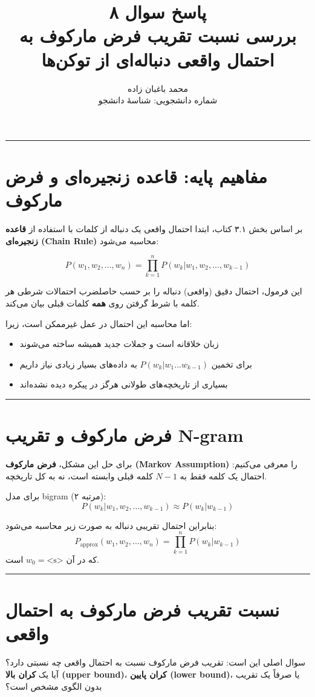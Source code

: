 \documentclass[11pt,a4paper]{article}
\title{\textbf{پاسخ سوال ۸} \\[0.4cm] \footnotesize بررسی نسبت تقریب فرض مارکوف به احتمال واقعی دنباله‌ای از توکن‌ها}
\author{محمد باغبان زاده \\ شماره دانشجویی: شناسهٔ دانشجو}
\date{}
\newcommand{\en}[1]{\textenglish{#1}}
\newcommand{\separator}{\vspace{1em}\noindent\rule{\linewidth}{0.4pt}\vspace{1em}}
\newcommand{\thickseparator}{\vspace{1em}\noindent\rule{\linewidth}{1pt}\vspace{1em}}
\begin{document}
\maketitle
\thickseparator

\section{مفاهیم پایه: قاعده زنجیره‌ای و فرض مارکوف}
بر اساس بخش \en{۳.۱} کتاب، ابتدا احتمال واقعی یک دنباله از کلمات با استفاده از \textbf{قاعده زنجیره‌ای (\en{Chain Rule})} محاسبه می‌شود:

\[
P(w_1, w_2, ..., w_n) = \prod_{k=1}^{n} P(w_k | w_1, w_2, ..., w_{k-1})
\]

این فرمول، احتمال دقیق (واقعی) دنباله را بر حسب حاصلضرب احتمالات شرطی هر کلمه با شرط گرفتن روی \textbf{همه} کلمات قبلی بیان می‌کند.

اما محاسبه این احتمال در عمل غیرممکن است، زیرا:
\begin{itemize}
\item زبان خلاقانه است و جملات جدید همیشه ساخته می‌شوند
\item برای تخمین $P(w_k | w_1...w_{k-1})$ به داده‌های بسیار زیادی نیاز داریم
\item بسیاری از تاریخچه‌های طولانی هرگز در پیکره دیده نشده‌اند
\end{itemize}

\separator
\newpage
\section{فرض مارکوف و تقریب \en{N-gram}}
برای حل این مشکل، \textbf{فرض مارکوف (\en{Markov Assumption})} را معرفی می‌کنیم: احتمال یک کلمه فقط به $N-1$ کلمه قبلی وابسته است، نه به کل تاریخچه.

برای مدل \en{bigram} (مرتبه ۲):
\[
P(w_k | w_1, w_2, ..., w_{k-1}) \approx P(w_k | w_{k-1})
\]

بنابراین احتمال تقریبی دنباله به صورت زیر محاسبه می‌شود:
\[
P_{\text{approx}}(w_1, w_2, ..., w_n) = \prod_{k=1}^{n} P(w_k | w_{k-1})
\]
که در آن $w_0 = \text{<s>}$ است.

\separator
\section{نسبت تقریب فرض مارکوف به احتمال واقعی}
سوال اصلی این است: تقریب فرض مارکوف نسبت به احتمال واقعی چه نسبتی دارد؟ آیا یک \textbf{کران بالا (\en{upper bound})}، \textbf{کران پایین (\en{lower bound})}، یا صرفاً یک تقریب بدون الگوی مشخص است؟
\end{document}
